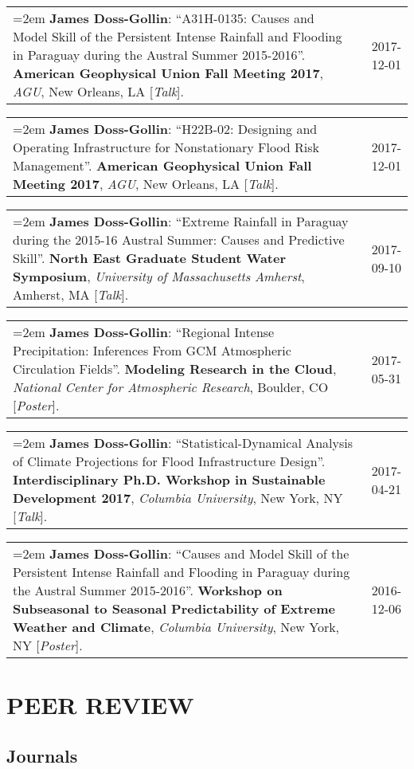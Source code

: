 \documentclass[10pt,oneside]{article}
\makeatletter
\newenvironment{alignedentrieshang}[1][2em]{%
  \noindent%
}{%
}
\newcommand{\hangingitem}[2]{%
  \noindent%
  \begin{tabular*}{\textwidth}{@{}p{0.85\textwidth}@{\extracolsep{\fill}}r@{}}%
    \hangindent=2em \hangafter=1 #1 & #2%
  \end{tabular*}%
}
\makeatother
\begin{document}
\begin{alignedentrieshang}
\hangingitem{\textbf{James Doss-Gollin}: \enquote{A31H-0135: Causes and Model Skill of the Persistent Intense Rainfall and Flooding in Paraguay during the Austral Summer 2015-2016}. \textbf{American Geophysical Union Fall Meeting 2017}, \textit{AGU}, New Orleans, LA [\textit{Talk}].}{2017-12-01}



\hangingitem{\textbf{James Doss-Gollin}: \enquote{H22B-02: Designing and Operating Infrastructure for Nonstationary Flood Risk Management}. \textbf{American Geophysical Union Fall Meeting 2017}, \textit{AGU}, New Orleans, LA [\textit{Talk}].}{2017-12-01}



\hangingitem{\textbf{James Doss-Gollin}: \enquote{Extreme Rainfall in Paraguay during the 2015-16 Austral Summer: Causes and Predictive Skill}. \textbf{North East Graduate Student Water Symposium}, \textit{University of Massachusetts Amherst}, Amherst, MA [\textit{Talk}].}{2017-09-10}



\hangingitem{\textbf{James Doss-Gollin}: \enquote{Regional Intense Precipitation: Inferences From GCM Atmospheric Circulation Fields}. \textbf{Modeling Research in the Cloud}, \textit{National Center for Atmospheric Research}, Boulder, CO [\textit{Poster}].}{2017-05-31}



\hangingitem{\textbf{James Doss-Gollin}: \enquote{Statistical-Dynamical Analysis of Climate Projections for Flood Infrastructure Design}. \textbf{Interdisciplinary Ph.D. Workshop in Sustainable Development 2017}, \textit{Columbia University}, New York, NY [\textit{Talk}].}{2017-04-21}



\hangingitem{\textbf{James Doss-Gollin}: \enquote{Causes and Model Skill of the Persistent Intense Rainfall and Flooding in Paraguay during the Austral Summer 2015-2016}. \textbf{Workshop on Subseasonal to Seasonal Predictability of Extreme Weather and Climate}, \textit{Columbia University}, New York, NY [\textit{Poster}].}{2016-12-06}


\end{alignedentrieshang}


\section{PEER REVIEW}

\subsection{Journals}
\end{document}
